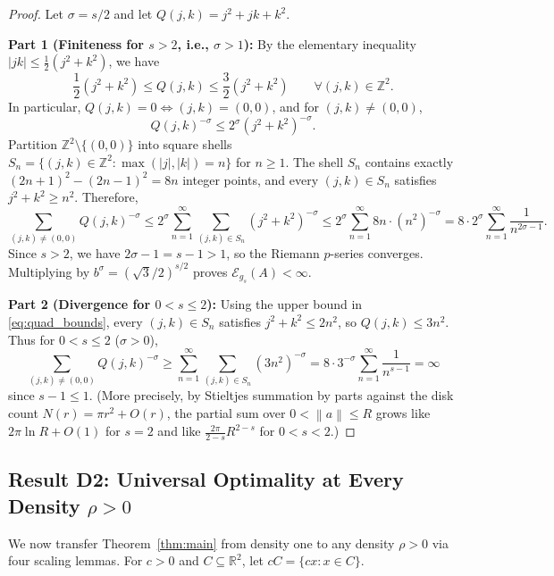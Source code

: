 \documentclass[11pt, a4paper]{article}
\theoremstyle{definition}
\theoremstyle{remark}
\newcommand{\R}{\mathbb{R}}
\newcommand{\Z}{\mathbb{Z}}
\newcommand{\Ecal}{\mathcal{E}}
\newcommand{\norm}[1]{\left\lVert #1 \right\rVert}
\newcommand{\abs}[1]{\left\lvert #1 \right\rvert}
\begin{document}
\begin{proof}
Let $\sigma = s/2$ and let $Q(j, k) = j^2 + j k + k^2$.

\noindent \textbf{Part 1 (Finiteness for $s > 2$, i.e., $\sigma > 1$):} By the elementary inequality $\abs{j k} \le \frac{1}{2}(j^2 + k^2)$, we have
\begin{equation}
\label{eq:quad_bounds}
\frac{1}{2}\left(j^2 + k^2\right) \le Q(j, k) \le \frac{3}{2}\left(j^2 + k^2\right) \qquad \forall (j, k) \in \Z^2.
\end{equation}
In particular, $Q(j, k) = 0 \iff (j, k) = (0, 0)$, and for $(j, k) \neq (0, 0)$,
\[
Q(j, k)^{-\sigma} \le 2^\sigma \left(j^2 + k^2\right)^{-\sigma}.
\]
Partition $\Z^2 \setminus \{(0, 0)\}$ into square shells $S_n = \{(j, k) \in \Z^2 : \max(\abs{j}, \abs{k}) = n\}$ for $n \ge 1$. The shell $S_n$ contains exactly $(2n+1)^2 - (2n-1)^2 = 8n$ integer points, and every $(j, k) \in S_n$ satisfies $j^2 + k^2 \ge n^2$. Therefore,
\[
\sum_{(j, k) \neq (0, 0)} Q(j, k)^{-\sigma} \le 2^\sigma \sum_{n=1}^\infty \sum_{(j, k) \in S_n} \left(j^2 + k^2\right)^{-\sigma} \le 2^\sigma \sum_{n=1}^\infty 8n \cdot \left(n^2\right)^{-\sigma} = 8 \cdot 2^\sigma \sum_{n=1}^\infty \frac{1}{n^{2\sigma - 1}}.
\]
Since $s > 2$, we have $2\sigma - 1 = s - 1 > 1$, so the Riemann $p$-series converges. Multiplying by $b^\sigma = (\sqrt{3}/2)^{s/2}$ proves $\Ecal_{g_s}(A) < \infty$.

\noindent \textbf{Part 2 (Divergence for $0 < s \le 2$):} Using the upper bound in \eqref{eq:quad_bounds}, every $(j, k) \in S_n$ satisfies $j^2 + k^2 \le 2n^2$, so $Q(j, k) \le 3n^2$. Thus for $0 < s \le 2$ ($\sigma > 0$),
\[
\sum_{(j, k) \neq (0, 0)} Q(j, k)^{-\sigma} \ge \sum_{n=1}^\infty \sum_{(j, k) \in S_n} \left(3n^2\right)^{-\sigma} = 8 \cdot 3^{-\sigma} \sum_{n=1}^\infty \frac{1}{n^{s - 1}} = \infty
\]
since $s - 1 \le 1$. (More precisely, by Stieltjes summation by parts against the disk count $N(r) = \pi r^2 + O(r)$, the partial sum over $0 < \norm{a} \le R$ grows like $2\pi \ln R + O(1)$ for $s = 2$ and like $\frac{2\pi}{2-s} R^{2-s}$ for $0 < s < 2$.)
\end{proof}

\subsection{Result D2: Universal Optimality at Every Density $\rho > 0$}

We now transfer Theorem~\ref{thm:main} from density one to any density $\rho > 0$ via four scaling lemmas. For $c > 0$ and $C \subseteq \R^2$, let $c C = \{c x : x \in C\}$.
\end{document}
